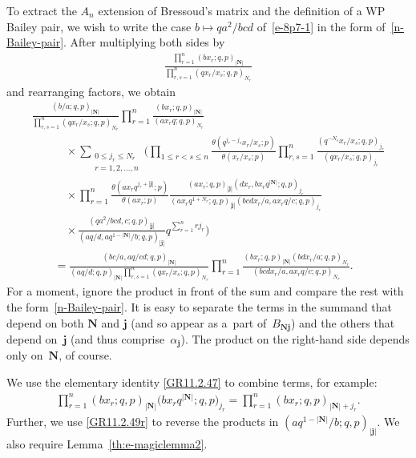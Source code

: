 \documentclass[pdftex]{sigma}
\numberwithin{equation}{section}
\newcommand{\sumN}{{\left| \boldsymbol{N} \right|}}
\newcommand\sumj{{\left| \boldsymbol {j} \right|}}
\newcommand{\N}{{ \boldsymbol N}}
\renewcommand{\j}{{ \boldsymbol{j}}}
\newcommand{\multsum}[3]{{\sum\limits_{\substack{{0\le #1_#3 \le #2_#3} \\
{#3 =1,2,\dots, n}}}}}
\newcommand{\triprod}[1]{\prod\limits_{1\le r < s \le #1}}
\newcommand{\sqprod}[1]{\prod\limits_{r, s =1}^{#1}} %
\newcommand{\smallprod}[1]{\prod\limits_{r =1}^{#1}} %
\newcommand{\xover}[1]{#1_{r}/#1_{s}}
\newcommand{\ellipticqrfac}[2]{{\left({#1}; q, p\right)_{#2}}} %
\newcommand{\elliptictheta}[1]{\theta \left({#1} ; p\right) }
\newcommand{\ellipticvandermonde}[3]{\triprod{#3} %
\!\! \frac{\elliptictheta{q^{#2_r-#2_s} \xover {#1} }}{\elliptictheta{\xover{#1}}}
}
\begin{document}
To extract the $A_n$ extension of Bressoud's matrix and the definition of a WP Bailey pair, we wish to write the case $b\mapsto qa^2/bcd$ of~\eqref{e-8p7-1} in the form of~\eqref{n-Bailey-pair}. After multiplying both sides by
\begin{gather*}
\frac{\smallprod n \ellipticqrfac{bx_r}{\sumN} } {\sqprod n \ellipticqrfac{q\xover{x}}{N_r} }
\end{gather*}
and rearranging factors, we obtain
\begin{gather}
\frac {\ellipticqrfac{b/a}{\sumN }} {\sqprod n \ellipticqrfac{qx_r/x_s}{N_r}}
\smallprod n \frac{ \ellipticqrfac{bx_r}{\sumN} }{\ellipticqrfac{ax_rq}{N_r}} \nonumber\\
\qquad\quad{} \times\multsum{j}{N}{r} \Bigg( \ellipticvandermonde{x}{j}{n}
\sqprod n \frac{\ellipticqrfac{q^{-N_s}\xover{x}}{j_r} }{\ellipticqrfac{q\xover{x}}{j_r} } \nonumber\\
\qquad\quad {}\times \smallprod n \frac{\elliptictheta{ ax_rq^{j_r+\sumj}}}{\elliptictheta{ax_r}}
\frac{\ellipticqrfac{ax_r}{\sumj}\ellipticqrfac{dx_r, bx_rq^{\sumN}}{j_r}}
{\ellipticqrfac{ax_rq^{1+N_r}}{\sumj}\ellipticqrfac{bcdx_r/a, ax_rq/c }{j_r}}\nonumber\\
\qquad\quad{} \times \frac{\ellipticqrfac{qa^2/bcd, c}{\sumj}}{\ellipticqrfac{aq/d,aq^{1-\sumN}/b}{\sumj}}
q^{\sum\limits_{r=1}^n r j_r}\Bigg)\nonumber\\
\qquad {} = \frac{\ellipticqrfac{bc/a, aq/cd}{\sumN}}{\ellipticqrfac{aq/d}{\sumN}
\sqprod n \ellipticqrfac{qx_r/x_s}{N_r}}
\smallprod n \frac{\ellipticqrfac{b x_r}{\sumN} \ellipticqrfac{bd x_r/a}{N_r}}
{\ellipticqrfac{bcd x_r/a, a x_rq/c}{N_r}} .\label{e-8p7-1-A}
\end{gather}
For a moment, ignore the product in front of the sum and compare the rest with the form~\eqref{n-Bailey-pair}. It is easy to separate the terms in the summand that depend on both $\N$ and $\j$ (and so appear as a~part of~$B_{\N\j}$) and the others that depend on~$\j$ (and thus comprise~$\alpha_\j$). The product on the right-hand side depends only on~$\N$, of course.

We use the elementary identity \eqref{GR11.2.47}
to combine terms, for example:
\begin{gather*}\smallprod n \ellipticqrfac{bx_r}{\sumN} \big(bx_rq^{\sumN};q,p\big)_{j_r} = \smallprod n \ellipticqrfac{bx_r}{\sumN+j_r}.
\end{gather*}
Further, we use \eqref{GR11.2.49r} to reverse the products in $\ellipticqrfac{aq^{1-\sumN}/b}{\sumj}$. We also require Lemma~\ref{th:e-magiclemma2}.
\end{document}
